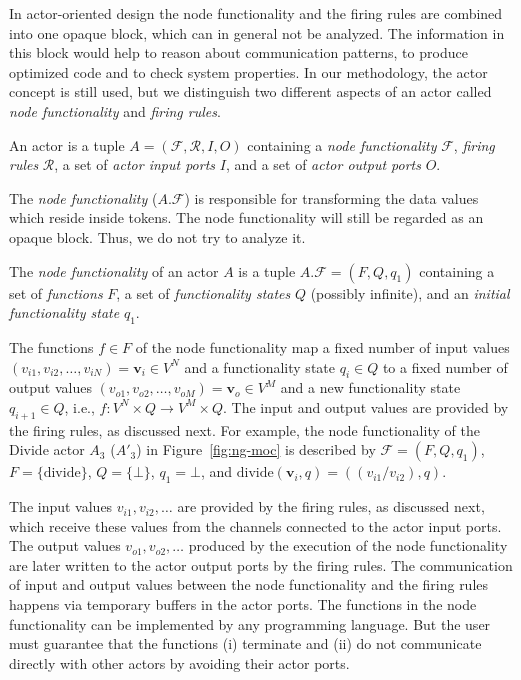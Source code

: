 In actor-oriented design the node functionality and the firing rules
are combined into one opaque block, which can in general not be analyzed.
The information in this block would help to reason about communication
patterns, to produce optimized code and to check system properties.
In our methodology, the actor concept is still used,
but we distinguish two different aspects of an actor called
\emph{node functionality} and \emph{firing rules}.

\begin{sdefinition}\label{actor}
An actor is a tuple $A=(\mathcal{F},\mathcal{R},I,O)$ containing
a \emph{node functionality} $\mathcal{F}$, \emph{firing rules} $\mathcal{R}$,
a set of \emph{actor input ports} $I$, and a set of \emph{actor output ports} $O$.
\end{sdefinition}

The  \emph{node functionality} ($A.\mathcal{F}$) is responsible for
transforming the data values which reside inside tokens. The node functionality
will still be regarded as an opaque block. Thus, we do not try to analyze it.

\begin{sdefinition}\label{node-functionality}
  The \emph{node functionality} of an actor $A$ is a tuple $A.\mathcal{F} = (F,Q,q_1)$
  containing a set of \emph{functions} $F$, a set of \emph{functionality states} $Q$
  (possibly infinite), and an \emph{initial functionality state} $q_1$.
\end{sdefinition}

The functions $f \in F$ of the node functionality map a fixed number of
input values $(v_{i1},v_{i2},\ldots,v_{iN}) = \mathbf{v}_i \in V^N$
and a functionality state $q_i \in Q$ to a fixed number of output values
$(v_{o1},v_{o2},\ldots,v_{oM}) = \mathbf{v}_o \in V^M$ and a new
functionality state $q_{i+1} \in Q$, i.e.,  $f: V^N \times Q \to V^M \times Q$.
The input and output values are provided by the firing rules,
as discussed next. For example, the node functionality of the Divide actor
$A_3$ ($A'_3$) in Figure~\ref{fig:ng-moc} is described by $\mathcal{F} = (F,Q,q_1)$,
$F = \{\textrm{divide}\}$, $Q= \{\bot\}$, $q_1 = \bot$, and $\textrm{divide}(\mathbf{v}_i,q) = ((v_{i1}/v_{i2}),q)$.

The input values $v_{i1}, v_{i2}, \ldots$ are provided by the firing rules,
as discussed next, which receive these values from the channels connected to the actor input ports.
The output values $v_{o1}, v_{o2}, \ldots$ produced by the execution of
the node functionality are later written to the actor output ports by
the firing rules. The communication of input and output values between the
node functionality and the firing rules happens via temporary buffers in
the actor ports.
The functions in the node functionality can be implemented by any
programming language. %
But the user must guarantee that the functions
(i) terminate and (ii) do not communicate directly with other actors
by avoiding their actor ports.

